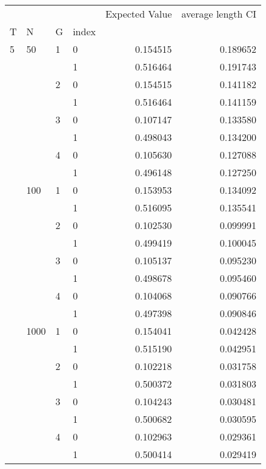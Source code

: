 \begin{tabular}{llllrr}
\toprule
   &      &   &   &  Expected Value &  average length CI \\
T & N & G & index &                 &                    \\
\midrule
5  & 50   & 1 & 0 &        0.154515 &           0.189652 \\
   &      &   & 1 &        0.516464 &           0.191743 \\
   &      & 2 & 0 &        0.154515 &           0.141182 \\
   &      &   & 1 &        0.516464 &           0.141159 \\
   &      & 3 & 0 &        0.107147 &           0.133580 \\
   &      &   & 1 &        0.498043 &           0.134200 \\
   &      & 4 & 0 &        0.105630 &           0.127088 \\
   &      &   & 1 &        0.496148 &           0.127250 \\
   & 100  & 1 & 0 &        0.153953 &           0.134092 \\
   &      &   & 1 &        0.516095 &           0.135541 \\
   &      & 2 & 0 &        0.102530 &           0.099991 \\
   &      &   & 1 &        0.499419 &           0.100045 \\
   &      & 3 & 0 &        0.105137 &           0.095230 \\
   &      &   & 1 &        0.498678 &           0.095460 \\
   &      & 4 & 0 &        0.104068 &           0.090766 \\
   &      &   & 1 &        0.497398 &           0.090846 \\
   & 1000 & 1 & 0 &        0.154041 &           0.042428 \\
   &      &   & 1 &        0.515190 &           0.042951 \\
   &      & 2 & 0 &        0.102218 &           0.031758 \\
   &      &   & 1 &        0.500372 &           0.031803 \\
   &      & 3 & 0 &        0.104243 &           0.030481 \\
   &      &   & 1 &        0.500682 &           0.030595 \\
   &      & 4 & 0 &        0.102963 &           0.029361 \\
   &      &   & 1 &        0.500414 &           0.029419 \\

\end{tabular}
